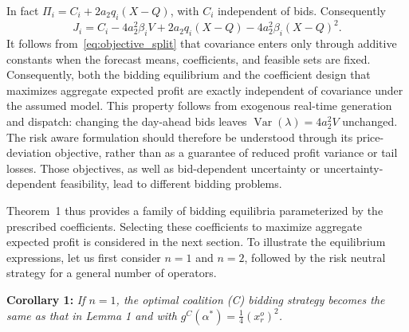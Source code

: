 \documentclass[journal]{IEEEtran}
\begin{document}
In fact $\Pi_i=C_i+2a_2q_i(X-Q)$, with $C_i$ independent of bids. Consequently
\begin{equation}
 J_i=C_i-4a_2^2\beta_iV+2a_2q_i(X-Q)
       -4a_2^2\beta_i(X-Q)^2. \label{eq:objective_split}
\end{equation}
It follows from~\eqref{eq:objective_split} that covariance enters only through additive constants when the forecast means, coefficients, and feasible sets are fixed. Consequently, both the bidding equilibrium and the coefficient design that maximizes aggregate expected profit are exactly independent of covariance under the assumed model. This property follows from exogenous real-time generation and dispatch: changing the day-ahead bids leaves $\operatorname{Var}(\lambda)=4a_2^2V$ unchanged. The risk aware formulation should therefore be understood through its price-deviation objective, rather than as a guarantee of reduced profit variance or tail losses. Those objectives, as well as bid-dependent uncertainty or uncertainty-dependent feasibility, lead to different bidding problems.

Theorem~1 thus provides a family of bidding equilibria parameterized by the prescribed coefficients. Selecting these coefficients to maximize aggregate expected profit is considered in the next section. To illustrate the equilibrium expressions, let us first consider $n=1$ and $n=2$, followed by the risk neutral strategy for a general number of operators.

\noindent  \textbf{Corollary 1:} {\it If $n=1$, the optimal coalition (C) bidding strategy becomes the same as that in Lemma 1 and with $g^C(\alpha^*)=\frac{1}{4} (x_r^o)^2$.}
\end{document}
